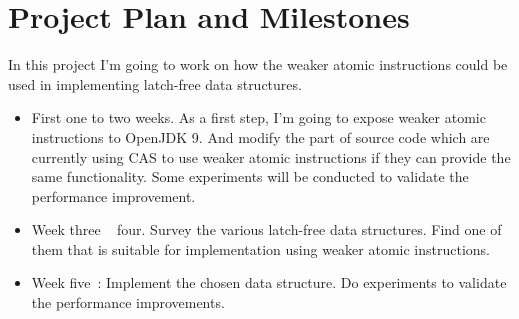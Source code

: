 \documentclass{sig-alternate}
\begin{document}
\section{Project Plan and Milestones}

In this project I'm going to work on how the weaker atomic
instructions could be used in implementing latch-free data structures. 

\begin{itemize}

  \item First one to two weeks. As a first step, I'm going to expose
    weaker atomic instructions to OpenJDK 9. And modify the part of
    source code which are currently using CAS to use weaker atomic
    instructions if they can provide the same functionality. Some
    experiments will be conducted to validate the performance
    improvement.

\item Week three ~ four. Survey the various latch-free data
  structures. Find one of them that is suitable for implementation
  using weaker atomic instructions.

\item Week five~: Implement the chosen data structure. Do experiments
  to validate the performance improvements. 

\end{itemize}



\end{document}
